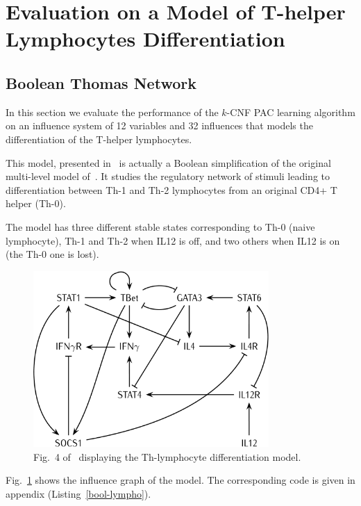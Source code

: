 \documentclass{llncs}
\begin{document}
\section{Evaluation on a Model of T-helper Lymphocytes Differentiation}\label{ex:lympho}


\subsection{Boolean Thomas Network}

In this section we evaluate the performance of the $k$-CNF PAC learning
algorithm on an influence system of 12 variables and 32 influences that models
the differentiation of the T-helper lymphocytes.

This model, presented in~\cite{RRMTC06tcsb} is actually a Boolean
simplification of the original multi-level model
of~\cite{Mendoza06biosystems}. It studies the regulatory network of stimuli
leading to differentiation between Th-1 and Th-2 lymphocytes from an original
CD4+ T helper (Th-0).

The model has three different stable states corresponding to Th-0 (naive
lymphocyte), Th-1 and Th-2 when IL12 is off, and two others when IL12 is on
(the Th-0 one is lost).

\begin{figure}[htbp]
   \centering
   \includegraphics[width=0.8\textwidth]{th_net_clean.png}
   \caption{Fig.~4 of~\cite{RRMTC06tcsb} displaying the Th-lymphocyte
   differentiation model.\label{fig:lympho}}
\end{figure}

Fig.~\ref{fig:lympho} shows the influence graph of the model. The
corresponding code is given in appendix (Listing~\ref{bool-lympho}).
\end{document}
